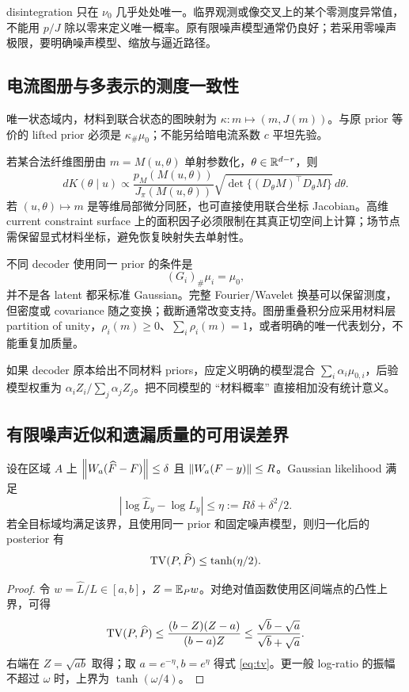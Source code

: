 disintegration 只在 $\nu_0$ 几乎处处唯一。临界观测或像交叉上的某个零测度异常值，不能用 $p/J$ 除以零来定义唯一概率。原有限噪声模型通常仍良好；若采用零噪声极限，要明确噪声模型、缩放与逼近路径。

\subsection{电流图册与多表示的测度一致性}

唯一状态域内，材料到联合状态的图映射为 $\kappa:m\mapsto(m,J(m))$。与原 prior 等价的 lifted prior 必须是 $\kappa_\#\mu_0$；不能另给暗电流系数 $c$ 平坦先验。

若某合法纤维图册由 $m=M(u,\theta)$ 单射参数化，$\theta\in\mathbb R^{d-r}$，则
\begin{equation}
dK(\theta\mid u)\propto
\frac{p_M(M(u,\theta))}{J_\pi(M(u,\theta))}
\sqrt{\det\{(D_\theta M)^\top D_\theta M\}}\,d\theta.\label{eq:current-weight}
\end{equation}
若 $(u,\theta)\mapsto m$ 是等维局部微分同胚，也可直接使用联合坐标 Jacobian。高维 current constraint surface 上的面积因子必须限制在其真正切空间上计算；场节点需保留显式材料坐标，避免恢复映射失去单射性。

不同 decoder 使用同一 prior 的条件是
\begin{equation}
(G_i)_\#\mu_i=\mu_0,
\end{equation}
并不是各 latent 都采标准 Gaussian。完整 Fourier/Wavelet 换基可以保留测度，但密度或 covariance 随之变换；截断通常改变支持。图册重叠积分应采用材料层 partition of unity，$\rho_i(m)\ge0$、$\sum_i\rho_i(m)=1$，或者明确的唯一代表划分，不能重复加质量。

如果 decoder 原本给出不同材料 priors，应定义明确的模型混合 $\sum_i\alpha_i\mu_{0,i}$，后验模型权重为 $\alpha_iZ_i/\sum_j\alpha_jZ_j$。把不同模型的 ``材料概率'' 直接相加没有统计意义。

\subsection{有限噪声近似和遗漏质量的可用误差界}

设在区域 $A$ 上 $\left\lVert W_a(\widehat F-F)\right\rVert\le\delta$ 且 $\left\lVert W_a(F-y)\right\rVert\le R$。Gaussian likelihood 满足
\begin{equation}
|\log\widehat L_y-\log L_y|\le\eta:=R\delta+\delta^2/2.
\end{equation}
若全目标域均满足该界，且使用同一 prior 和固定噪声模型，则归一化后的 posterior 有
\begin{equation}
\operatorname{TV}(P,\widehat P)\le\tanh(\eta/2).\label{eq:tv}
\end{equation}
\begin{proof}
令 $w=\widehat L/L\in[a,b]$，$Z=\mathbb E_Pw$。对绝对值函数使用区间端点的凸性上界，可得
\[
\operatorname{TV}(P,\widehat P)\le\frac{(b-Z)(Z-a)}{(b-a)Z}
\le\frac{\sqrt b-\sqrt a}{\sqrt b+\sqrt a}.
\]
右端在 $Z=\sqrt{ab}$ 取得；取 $a=e^{-\eta},b=e^\eta$ 得式 \eqref{eq:tv}。更一般 log-ratio 的振幅不超过 $\omega$ 时，上界为 $\tanh(\omega/4)$。
\end{proof}

